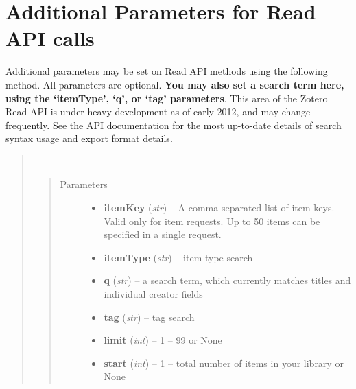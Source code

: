 \documentclass[letterpaper,10pt,english]{sphinxmanual}
\begin{document}
\section{Additional Parameters for Read API calls}
\label{index:additional-parameters-for-read-api-calls}
Additional parameters may be set on Read API methods using the following method. All parameters are optional. \textbf{You may also set a search term here, using the `itemType', `q', or `tag' parameters}. This area of the Zotero Read API is under heavy development as of early 2012, and may change frequently. See \href{http://www.zotero.org/support/dev/server\_api/read\_api\#search\_syntax}{the API documentation} for the most up-to-date details of search syntax usage and export format details.
\begin{quote}

\begin{fulllineitems}
\label{index:pyzotero.zotero.Zotero.add_parameters}~\begin{quote}\begin{description}
\item[{Parameters}] \leavevmode\begin{itemize}
\item {} 
\textbf{itemKey} (\emph{str}) -- A comma-separated list of item keys. Valid only for item requests. Up to 50 items can be specified in a single request.

\item {} 
\textbf{itemType} (\emph{str}) -- item type search

\item {} 
\textbf{q} (\emph{str}) -- a search term, which currently matches titles and individual creator fields

\item {} 
\textbf{tag} (\emph{str}) -- tag search

\item {} 
\textbf{limit} (\emph{int}) -- 1 – 99 or None

\item {} 
\textbf{start} (\emph{int}) -- 1 – total number of items in your library or None


\end{itemize}
\end{description}
\end{quote}
\end{fulllineitems}
\end{quote}
\end{document}
